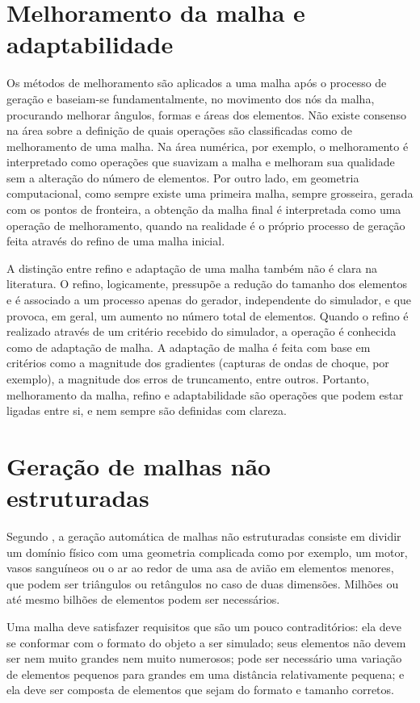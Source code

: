 \section{Melhoramento da malha e adaptabilidade}
Os métodos de melhoramento são aplicados a uma malha após o processo de geração e baseiam-se fundamentalmente, no movimento dos nós da malha, procurando melhorar ângulos, formas e áreas dos elementos. Não existe consenso na área sobre a definição de quais operações são classificadas como de melhoramento de uma malha. Na área numérica, por exemplo, o melhoramento é interpretado como operações que suavizam a malha e melhoram sua qualidade sem a alteração do número de elementos. Por outro lado, em geometria computacional, como sempre existe uma primeira malha, sempre grosseira, gerada com os pontos de fronteira, a obtenção da malha final é interpretada como uma operação de melhoramento, quando na realidade é o próprio processo de geração feita através do refino de uma malha inicial.

A distinção entre refino e adaptação de uma malha também não é clara na literatura. O refino, logicamente, pressupõe a redução do tamanho dos elementos e é associado a um processo apenas do gerador, independente do simulador, e que provoca, em geral, um aumento no número total de elementos.
Quando o refino é realizado através de um critério recebido do simulador, a operação é conhecida como de adaptação de malha. A adaptação de malha é feita com base em critérios como a magnitude dos gradientes (capturas de ondas de choque, por exemplo), a magnitude dos erros de truncamento, entre outros. Portanto, melhoramento da malha, refino e adaptabilidade são operações que podem estar ligadas entre si, e nem sempre são definidas com clareza.

\section{Geração de malhas não estruturadas}

Segundo \cite{Shewchuk1992}, a geração automática de malhas não estruturadas consiste em dividir um domínio físico com uma geometria complicada como por exemplo, um motor, vasos sanguíneos ou o ar ao redor de uma asa de avião em elementos menores, que podem ser triângulos ou retângulos no caso de duas dimensões. Milhões ou até mesmo bilhões de elementos podem ser necessários.

Uma malha deve satisfazer requisitos que são um pouco contraditórios: ela deve se conformar com o formato do objeto a ser simulado; seus elementos não devem ser nem muito grandes nem muito numerosos; pode ser necessário uma variação de elementos pequenos para grandes em uma distância relativamente pequena; e ela deve ser composta de elementos que sejam do formato e tamanho corretos.

